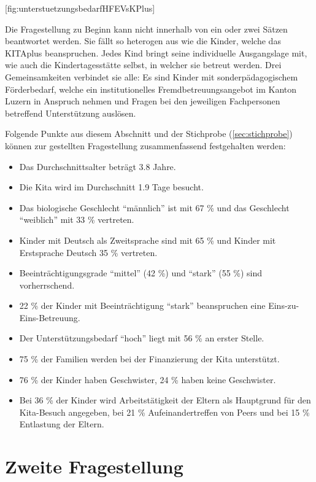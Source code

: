 \documentclass[
  ngerman,
  11pt,
  paper=a4,
  twoside,
  titlepage=true,
  openright,
  abstract=on,
  toc=listofnumbered,
  numbers=noenddot,
  chapterprefix=true,
  headings=optiontohead,
  svgnames,
  dvipsnames]{scrreprt}
\providecommand{\tightlist}{%
  \setlength{\itemsep}{0pt}\setlength{\parskip}{0pt}}
\begin{document}
[fig:unterstuetzungsbedarfHFEVsKPlus]

Die Fragestellung zu Beginn kann nicht innerhalb von ein oder zwei
Sätzen beantwortet werden. Sie fällt so heterogen aus wie die Kinder,
welche das KITAplus beanspruchen. Jedes Kind bringt seine individuelle
Ausgangslage mit, wie auch die Kindertagesstätte selbst, in welcher sie
betreut werden. Drei Gemeinsamkeiten verbindet sie alle: Es sind Kinder
mit sonderpädagogischem Förderbedarf, welche ein institutionelles
Fremdbetreuungsangebot im Kanton Luzern in Anspruch nehmen und Fragen
bei den jeweiligen Fachpersonen betreffend Unterstützung auslösen.

Folgende Punkte aus diesem Abschnitt und der Stichprobe
(\cref{sec:stichprobe}) können zur gestellten Fragestellung
zusammenfassend festgehalten werden:

\begin{itemize}
\tightlist
\item
  Das Durchschnittsalter beträgt 3.8 Jahre.
\item
  Die Kita wird im Durchschnitt 1.9 Tage besucht.
\item
  Das biologische Geschlecht “männlich” ist mit 67 \% und das Geschlecht
  “weiblich” mit 33 \% vertreten.
\item
  Kinder mit Deutsch als Zweitsprache sind mit 65 \% und Kinder mit
  Erstsprache Deutsch 35 \% vertreten.
\item
  Beeinträchtigungsgrade “mittel” (42 \%) und “stark” (55 \%) sind
  vorherrschend.
\item
  22 \% der Kinder mit Beeinträchtigung “stark” beanspruchen eine
  Eins-zu-Eins-Betreuung.
\item
  Der Unterstützungsbedarf “hoch” liegt mit 56 \% an erster Stelle.
\item
  75 \% der Familien werden bei der Finanzierung der Kita unterstützt.
\item
  76 \% der Kinder haben Geschwister, 24 \% haben keine Geschwister.
\item
  Bei 36 \% der Kinder wird Arbeitstätigkeit der Eltern als Hauptgrund
  für den Kita-Besuch angegeben, bei 21 \% Aufeinandertreffen von Peers
  und bei 15 \% Entlastung der Eltern.
\end{itemize}

\hypertarget{sec:fragestellung2beantwortung}{%
\section{Zweite Fragestellung}\label{sec:fragestellung2beantwortung}}
\end{document}
